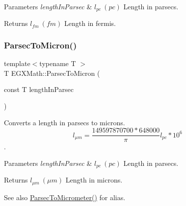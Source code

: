\begin{DoxyParams}{Parameters}
{\em length\+In\+Parsec} & $ l_{pc}\ (pc)$ Length in parsecs. \\
\hline
\end{DoxyParams}
\begin{DoxyReturn}{Returns}
$ l_{fm}\ (fm)$ Length in fermis. 
\end{DoxyReturn}
\mbox{\label{group___e_g_x_math-_conversions-_length_conversions-_astronomical-_parsec-_non-_s_i_ga9460305baf1a39635da24198d888a91b}} 
\subsubsection{\texorpdfstring{Parsec\+To\+Micron()}{ParsecToMicron()}}
{\footnotesize\ttfamily template$<$typename T $>$ \\
T E\+G\+X\+Math\+::\+Parsec\+To\+Micron (\begin{DoxyParamCaption}\item[{const T}]{length\+In\+Parsec }\end{DoxyParamCaption})}



Converts a length in parsecs to microns. \[ l_{\mu m}=\frac{149597870700 * 648000}{\pi}l_{pc} * 10^{6} \]. 


\begin{DoxyParams}{Parameters}
{\em length\+In\+Parsec} & $ l_{pc}\ (pc)$ Length in parsecs. \\
\hline
\end{DoxyParams}
\begin{DoxyReturn}{Returns}
$ l_{\mu m}\ (\mu m)$ Length in microns. 
\end{DoxyReturn}
\begin{DoxySeeAlso}{See also}
\mbox{\hyperlink{group___e_g_x_math-_conversions-_length_conversions-_astronomical-_parsec-_s_i_ga1eea34f6cb4b5a7b5dec1cd75863f191}{Parsec\+To\+Micrometer()}} for alias. 
\end{DoxySeeAlso}
\mbox{\label{group___e_g_x_math-_conversions-_length_conversions-_astronomical-_parsec-_non-_s_i_gaf076c4eb125bbc9fbabc040300961b6d}} 
